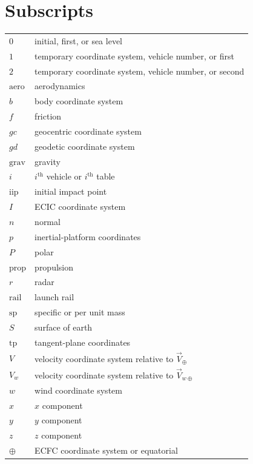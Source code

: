 \section*{Subscripts}
\begingroup
\setlength{\LTpre}{0pt}
\setlength{\LTpost}{0pt}
\renewcommand{\arraystretch}{1.08}
\begin{longtable}{@{}>{\raggedleft\arraybackslash}p{}p{}@{}}
$0$ & initial, first, or sea level \\
$1$ & temporary coordinate system, vehicle number, or first \\
$2$ & temporary coordinate system, vehicle number, or second \\
$\mathrm{aero}$ & aerodynamics \\
$b$ & body coordinate system \\
$f$ & friction \\
$gc$ & geocentric coordinate system \\
$gd$ & geodetic coordinate system \\
$\mathrm{grav}$ & gravity \\
$i$ & $i^{\mathrm{th}}$ vehicle or $i^{\mathrm{th}}$ table \\
$\mathrm{iip}$ & initial impact point \\
$I$ & ECIC coordinate system \\
$n$ & normal \\
$p$ & inertial-platform coordinates \\
$P$ & polar \\
$\mathrm{prop}$ & propulsion \\
$r$ & radar \\
$\mathrm{rail}$ & launch rail \\
$\mathrm{sp}$ & specific or per unit mass \\
$S$ & surface of earth \\
$\mathrm{tp}$ & tangent-plane coordinates \\
$V$ & velocity coordinate system relative to $\vec{V}_{\oplus}$ \\
$V_w$ & velocity coordinate system relative to $\vec{V}_{w\oplus}$ \\
$w$ & wind coordinate system \\
$x$ & $x$ component \\
$y$ & $y$ component \\
$z$ & $z$ component \\
$\oplus$ & ECFC coordinate system or equatorial \\
\end{longtable}
\endgroup
\clearpage
